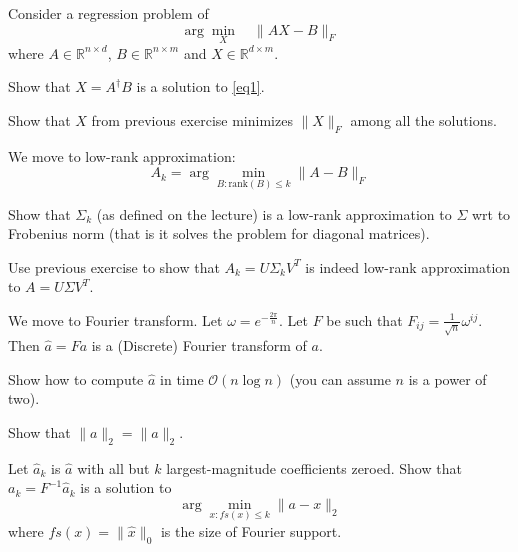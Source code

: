 \documentclass[12pt]{uebung}
\begin{document}
 

\newcommand{\bigo}{\mathcal{O}}
\renewcommand{\aufgname}{Exercise}

Consider a regression problem of 
\begin{equation}
\label{eq1}
\arg \min_{X}\quad \|AX - B\|_F
\end{equation}
where $A \in \mathbb{R}^{n \times d}$, $B \in \mathbb{R}^{n \times m}$ and $X \in \mathbb{R}^{d \times m}$.

\begin{aufg}
Show that $X = A^\dagger B$ is a solution to \eqref{eq1}.
\end{aufg}
\begin{aufg}
Show that $X$ from previous exercise minimizes $\|X\|_F$ among all the solutions.
\end{aufg}

\vspace{2cm}
We move to low-rank approximation:
$$A_k = \arg \min_{B : \text{rank}(B) \le k} \|A - B\|_F$$
\begin{aufg}
Show that $\Sigma_k$ (as defined on the lecture) is a low-rank approximation to $\Sigma$ wrt to Frobenius norm (that is it solves the problem for diagonal matrices).
\end{aufg}
\begin{aufg}
Use previous exercise to show that $A_k = U \Sigma_k V^T$ is indeed low-rank approximation to $A = U \Sigma V^T$.
\end{aufg}

\vspace{2cm}

We move to Fourier transform. Let $\omega = e^{-\frac{2 \pi}{n}}$. Let $F$ be such that $F_{ij} = \frac{1}{\sqrt{n}}\omega^{ij}$. Then $\hat{a} = F a$ is a (Discrete) Fourier transform of $a$.
\begin{aufg}
Show how to compute $\hat{a}$ in time $\bigo(n \log n)$ (you can assume $n$ is a power of two).
\end{aufg}

\begin{aufg}
Show that $\|a\|_2 = \|\hat{a}\|_2$.
\end{aufg}

\begin{aufg}
Let $\hat{a}_k$ is $\hat{a}$ with all but $k$ largest-magnitude coefficients zeroed. Show that $a_k = F^{-1} \hat{a}_k$ is a solution to
$$\arg \min_{x : fs(x) \le k} \|a - x\|_2$$
where $fs(x) = \|\hat{x}\|_0$ is the size of Fourier support.
\end{aufg}
\end{document}
